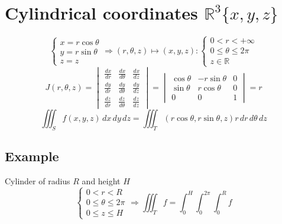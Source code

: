 \documentclass[12pt]{article}
\newcommand{\BR}{\mathbb R}
\begin{document}
\section*{Cylindrical coordinates $\BR^3\{x,y,z\}$}
    \[
        \begin{cases}
            x=r\cos\theta \\
            y=r\sin\theta \\
            z=z
        \end{cases}
        \Rightarrow (r,\theta,z)\mapsto(x,y,z):
        \begin{cases}
            0<r<+\infty \\
            0\leq\theta\leq 2\pi \\
            z\in\BR
        \end{cases}
    \]
    \[
        J(r,\theta,z)=
        \begin{vmatrix*}
            \frac{dx}{dr} & \frac{dx}{d\theta} & \frac{dx}{dz} \\
            \frac{dy}{dr} & \frac{dy}{d\theta} & \frac{dy}{dz} \\
            \frac{dz}{dr} & \frac{dz}{d\theta} & \frac{dz}{dz}
        \end{vmatrix*}
        =
        \begin{vmatrix*}
            \cos\theta & -r\sin\theta & 0 \\
            \sin\theta & r\cos\theta & 0 \\
            0 & 0 & 1
        \end{vmatrix*}
        = r
    \]
    \[ \iiint_Sf(x,y,z)\,dx\,dy\,dz=\iiint_T(r\cos\theta,r\sin\theta,z)r\,dr\,d\theta\,dz \]
    \subsection*{Example}
        Cylinder of radius $R$ and height $H$ \\
        \[
            \begin{cases}
                0<r<R \\
                0\leq\theta\leq 2\pi \\
                0\leq z\leq H  
            \end{cases}
            \Rightarrow \iiint_Tf=\int_0^H\int_0^{2\pi}\int_0^Rf
        \]
\end{document}
